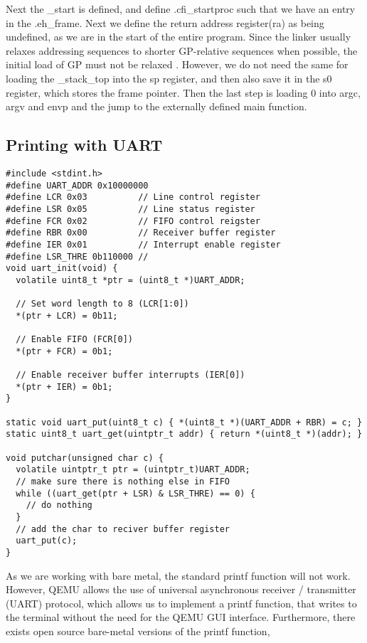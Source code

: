 Next the \_start is defined, and define .cfi\_startproc such that we have an entry in the
.eh\_frame. Next we define the return address register(ra) as being undefined, as we are in
the start of the entire program. Since the linker usually relaxes addressing sequences to
shorter GP-relative sequences when possible, the initial load of GP must not be relaxed
\cite{GNU_BIN}. However, we do not need the same for loading the \_stack\_top into the sp
register, and then also save it in the s0 register, which stores the frame pointer.
Then the last step is loading 0 into argc, argv and envp and the jump to the externally
defined main function.

\subsection{Printing with UART}
\begin{lstlisting}[float=*, label=lst:putchar, caption=Implementation of putchar of stdarg lib]
#include <stdint.h>
#define UART_ADDR 0x10000000
#define LCR 0x03          // Line control register
#define LSR 0x05          // Line status register
#define FCR 0x02          // FIFO control reigster
#define RBR 0x00          // Receiver buffer register
#define IER 0x01          // Interrupt enable register
#define LSR_THRE 0b110000 //
void uart_init(void) {
  volatile uint8_t *ptr = (uint8_t *)UART_ADDR;

  // Set word length to 8 (LCR[1:0])
  *(ptr + LCR) = 0b11;

  // Enable FIFO (FCR[0])
  *(ptr + FCR) = 0b1;

  // Enable receiver buffer interrupts (IER[0])
  *(ptr + IER) = 0b1;
}

static void uart_put(uint8_t c) { *(uint8_t *)(UART_ADDR + RBR) = c; }
static uint8_t uart_get(uintptr_t addr) { return *(uint8_t *)(addr); }

void putchar(unsigned char c) {
  volatile uintptr_t ptr = (uintptr_t)UART_ADDR;
  // make sure there is nothing else in FIFO
  while ((uart_get(ptr + LSR) & LSR_THRE) == 0) {
    // do nothing
  }
  // add the char to reciver buffer register
  uart_put(c);
}
\end{lstlisting}
As we are working with bare metal, the standard printf function will not work. However, QEMU
allows the use of universal asynchronous receiver / transmitter (UART) protocol, which allows
us to implement a printf function, that writes to the terminal without the need for the QEMU
GUI interface. Furthermore, there exists open source bare-metal versions of the printf function,
